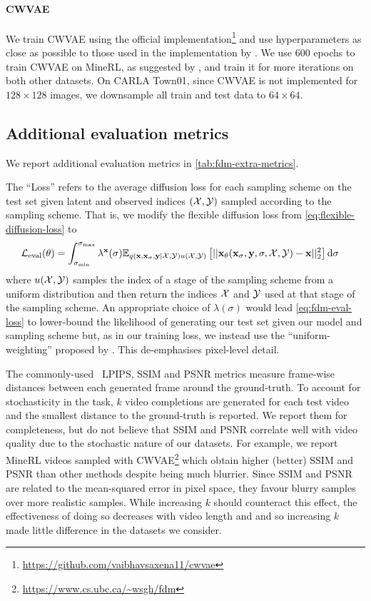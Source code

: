 \paragraph{CWVAE}
We train CWVAE using the official implementation\footnote{\url{https://github.com/vaibhavsaxena11/cwvae}} and use hyperparameters as close as possible to those used in the implementation by \citet{saxena2021clockwork}. We use 600 epochs to train CWVAE on MineRL, as suggested by \citet{saxena2021clockwork}, and train it for more iterations on both other datasets. On CARLA Town01, since CWVAE is not implemented for $128\times128$ images, we downsample all train and test data to $64\times64$.

\subsection{Additional evaluation metrics}
We report additional evaluation metrics in \cref{tab:fdm-extra-metrics}. 

The ``Loss'' refers to the average diffusion loss for each sampling scheme on the test set given latent and observed indices $({\mathcal{X}}, {\mathcal{Y}})$ sampled according to the sampling scheme. That is, we modify the flexible diffusion loss from \cref{eq:flexible-diffusion-loss} to
\begin{align} \label{eq:fdm-eval-loss}
    \mathcal{L}_\text{eval}(\theta) &= \int_{\sigma_\text{min}}^{\sigma_\text{max}} \lambda^{\mathbf{x}}(\sigma) \mathbb{E}_{q({\mathbf{x}}, {\mathbf{x}}_\sigma, {\mathbf{y}}|{\mathcal{X}}, {\mathcal{Y}})u({\mathcal{X}}, {\mathcal{Y}})} \left[ 
    || {\mathbf{x}}_\theta({\mathbf{x}}_\sigma, {\mathbf{y}}, \sigma, {\mathcal{X}}, {\mathcal{Y}}) - {\mathbf{x}} ||_2^2 \right] \mathrm{d}\sigma
\end{align}
where $u({\mathcal{X}}, {\mathcal{Y}})$ samples the index of a stage of the sampling scheme from a uniform distribution and then return the indices ${\mathcal{X}}$ and ${\mathcal{Y}}$ used at that stage of the sampling scheme. An appropriate choice of $\lambda(\sigma)$ would lead \cref{eq:fdm-eval-loss} to lower-bound the likelihood of generating our test set given our model and sampling scheme but, as in our training loss, we instead use the ``uniform-weighting'' proposed by \citet{ho2020denoising}. This de-emphasises pixel-level detail. 

The commonly-used~\citep{saxena2021clockwork,babaeizadeh2021fitvid} LPIPS, SSIM and PSNR metrics measure frame-wise distances between each generated frame around the ground-truth. To account for stochasticity in the task, $k$ video completions are generated for each test video and the smallest distance to the ground-truth is reported. We report them for completeness, but do not believe that SSIM and PSNR correlate well with video quality due to the stochastic nature of our datasets. For example, we report MineRL videos sampled with CWVAE\footnote{\url{https://www.cs.ubc.ca/~wsgh/fdm}} which obtain higher (better) SSIM and PSNR than other methods despite being much blurrier. Since SSIM and PSNR are related to the mean-squared error in pixel space, they favour blurry samples over more realistic samples. While increasing $k$ should counteract this effect, the effectiveness of doing so decreases with video length and and so increasing $k$ made little difference in the datasets we consider.


